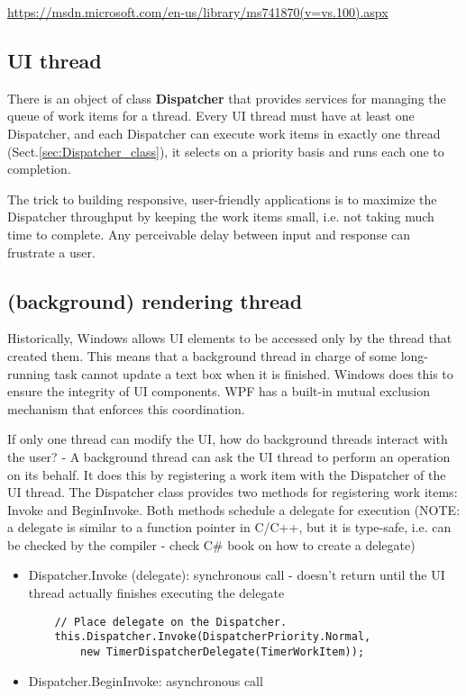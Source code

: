 \url{https://msdn.microsoft.com/en-us/library/ms741870(v=vs.100).aspx}

\subsection{UI thread}
\label{sec:UI-thread}

There is an object of class {\bf Dispatcher} that provides services for managing
the queue of work items for a thread.
Every UI thread must have at least one Dispatcher, and each Dispatcher can
execute work items in exactly one thread (Sect.\ref{sec:Dispatcher_class}), it
selects on a priority basis and runs each one to completion. 

The trick to building responsive, user-friendly applications is to maximize the
Dispatcher throughput by keeping the work items small, i.e. not taking much
time to complete.  Any perceivable delay between input and response can
frustrate a user.



\subsection{(background) rendering thread}
\label{sec:rendering-thread}

Historically, Windows allows UI elements to be accessed only by the thread that
created them. This means that a background thread in charge of some long-running
task cannot update a text box when it is finished. Windows does this to ensure
the integrity of UI components. WPF has a built-in mutual exclusion mechanism
that enforces this coordination. 

If only one thread can modify the UI, how do background threads interact with
the user? - A background thread can ask the UI thread to perform an operation on
its behalf. It does this by registering a work item with the Dispatcher of the
UI thread. The Dispatcher class provides two methods for registering work items: Invoke and BeginInvoke.
Both methods schedule a delegate for execution (NOTE: a delegate is similar to
a function pointer in C/C++, but it is type-safe, i.e. can be checked by the
compiler - check C\# book on how to create a delegate)
  
\begin{itemize}
  \item Dispatcher.Invoke (delegate): synchronous call - doesn't
  return until the UI thread actually finishes executing the delegate

\begin{lstlisting}
    // Place delegate on the Dispatcher.
    this.Dispatcher.Invoke(DispatcherPriority.Normal,
        new TimerDispatcherDelegate(TimerWorkItem));
\end{lstlisting}    

  \item Dispatcher.BeginInvoke: asynchronous call
\end{itemize}

